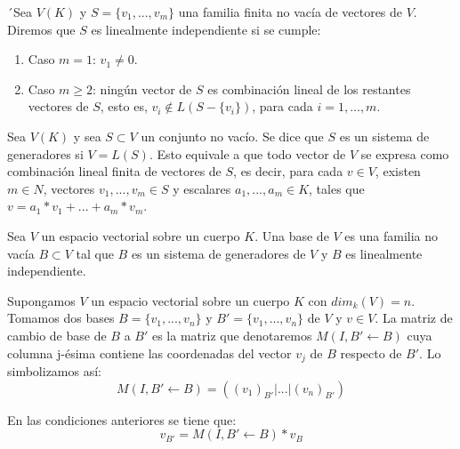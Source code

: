 \documentclass[a4paper,11pt, oneside]{book}
\begin{document}
\begin{linealmente_indep}
	´Sea $V(K)$ y $S = \{v_1,...,v_m\}$ una familia finita no vacía de vectores de $V$. Diremos que $S$ es linealmente independiente si se cumple:
	\begin{enumerate}
		\item Caso $m=1$: $v_1 \neq 0$.
		\item Caso $m \geq 2$: ningún vector de $S$ es combinación lineal de los restantes vectores de $S$, esto es, $v_i \notin L(S -\{v_i\})$, para cada $i=1,...,m$.
	\end{enumerate}
\end{linealmente_indep}
\begin{sistema_generadores}
	Sea $V(K)$ y sea $S \subset V$ un conjunto no vacío. Se dice que $S$ es un sistema de generadores si $V = L(S)$. Esto equivale a que todo vector de $V$ se expresa como combinación lineal finita de vectores de $S$, es decir, para cada $v \in V$, existen $m \in N$, vectores $v_1,...,v_m \in S$ y escalares $a_1,...,a_m \in K$, tales que $v = a_1*v_1+...+a_m*v_m$.
\end{sistema_generadores}
\begin{base}
	Sea $V$ un espacio vectorial sobre un cuerpo $K$. Una base de $V$ es una familia no vacía $B \subset V$ tal que $B$ es un sistema de generadores de $V$ y $B$ es linealmente independiente.
\end{base}
\begin{cambio_de_base}
	Supongamos $V$ un espacio vectorial sobre un cuerpo $K$ con $dim_k(V) = n$. Tomamos dos bases $B = \{v_1,...,v_n\}$ y $B' = \{v_1,...,v_n\}$ de $V$ y $ v \in V$. La matriz de cambio de base de $B$ a $B'$ es la matriz que denotaremos $M(I, B' \leftarrow B)$ cuya columna j-ésima contiene las coordenadas del vector $v_j$ de $B$ respecto de $B'$. Lo simbolizamos así:
	\begin{equation}
	M(I, B' \leftarrow B) = ((v_1)_{B'} | ... |(v_n)_{B'})
	\end{equation}
\end{cambio_de_base}
\begin{prop_cambio_de_base}
	En las condiciones anteriores se tiene que:
	\begin{equation}
	v_{B'} = M(I, B' \leftarrow B)* v_B
	\end{equation}
\end{prop_cambio_de_base}
\end{document}
